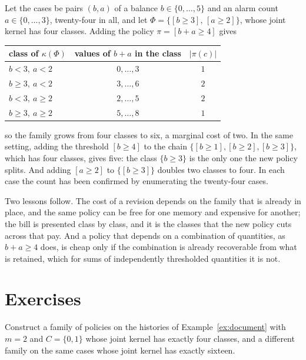 \begin{example}\label{ex:marginal-policy}
Let the cases be pairs $(b,a)$ of a balance $b\in\{0,\dots,5\}$ and an alarm count $a\in\{0,\dots,3\}$, twenty-four in all, and let $\Phi=\{[b\ge3],\,[a\ge2]\}$, whose joint kernel has four classes. Adding the policy $\pi=[b+a\ge4]$ gives
\begin{center}
\begin{tabular}{lcc}
\toprule
class of $\kappa(\Phi)$ & values of $b+a$ in the class & $|\pi(c)|$\\
\midrule
$b<3,\ a<2$ & $0,\dots,3$ & $1$\\
$b\ge3,\ a<2$ & $3,\dots,6$ & $2$\\
$b<3,\ a\ge2$ & $2,\dots,5$ & $2$\\
$b\ge3,\ a\ge2$ & $5,\dots,8$ & $1$\\
\bottomrule
\end{tabular}
\end{center}
so the family grows from four classes to six, a marginal cost of two. In the same setting, adding the threshold $[b\ge4]$ to the chain $\{[b\ge1],[b\ge2],[b\ge3]\}$, which has four classes, gives five: the class $\{b\ge3\}$ is the only one the new policy splits. And adding $[a\ge2]$ to $\{[b\ge3]\}$ doubles two classes to four. In each case the count has been confirmed by enumerating the twenty-four cases.
\end{example}

Two lessons follow. The cost of a revision depends on the family that is already in place, and the same policy can be free for one memory and expensive for another; the bill is presented class by class, and it is the classes that the new policy cuts across that pay. And a policy that depends on a combination of quantities, as $b+a\ge4$ does, is cheap only if the combination is already recoverable from what is retained, which for sums of independently thresholded quantities it is not.

\section*{Exercises}

\begin{exercise}
Construct a family of policies on the histories of Example~\ref{ex:document} with $m=2$ and $C=\{0,1\}$ whose joint kernel has exactly four classes, and a different family on the same cases whose joint kernel has exactly sixteen.
\end{exercise}

